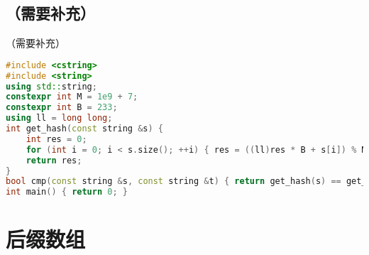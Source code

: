 \documentclass[9pt, a4paper, oneside]{book}
\begin{document}
\subsection{（需要补充）}
（需要补充）
\begin{lstlisting}[language={C++}]
#include <cstring>
#include <string>
using std::string;
constexpr int M = 1e9 + 7;
constexpr int B = 233;
using ll = long long;
int get_hash(const string &s) {
    int res = 0;
    for (int i = 0; i < s.size(); ++i) { res = ((ll)res * B + s[i]) % M; }
    return res;
}
bool cmp(const string &s, const string &t) { return get_hash(s) == get_hash(t); }
int main() { return 0; }\end{lstlisting}
\section{后缀数组}
\end{document}
